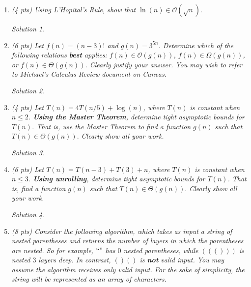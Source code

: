 \documentclass[12pt]{article}
\theoremstyle{remark}
\newtheorem*{solution}{Solution}
\newcommand{\makenonemptybox}[2]{%
\item[]
\fbox{%
\parbox[c][#1][t]{\dimexpr\linewidth-2\fboxsep-2\fboxrule}{
  \hrule width \hsize height 0pt
  #2
 }%
}%
\par\vspace{\ht\strutbox}
}
\begin{document}
\hrulefill

\begin{enumerate}


\pagebreak
\item {\itshape (4 pts) Using L'Hopital's Rule, show that $\ln(n) \in \mathcal{O}(\sqrt{n}).$}
\begin{solution}
\end{solution}

\pagebreak
\item {\itshape (6 pts) Let $f(n) = (n-3)!$ and $g(n) = 3^{5n}$. Determine which of the following relations \textbf{best} applies: $f(n) \in \mathcal{O}(g(n))$, $f(n) \in \Omega(g(n))$, or $f(n) \in \Theta(g(n))$. Clearly justify your answer. You may wish to refer to Michael's Calculus Review document on Canvas.}
\begin{solution}
\end{solution}

\pagebreak
\item {\itshape (4 pts) Let $T(n) = 4T(n/5) + \log(n)$, where $T(n)$ is constant when $n \leq 2$. \textbf{Using the Master Theorem}, determine tight asymptotic bounds for $T(n)$. That is, use the Master Theorem to find a function $g(n)$ such that $T(n) \in \Theta(g(n)).$ Clearly show all your work.}
\begin{solution}
\end{solution}


\pagebreak
\item {\itshape (6 pts) Let $T(n) = T(n-3) + T(3) + n$, where $T(n)$ is constant when $n \leq 3$. \textbf{Using unrolling}, determine tight asymptotic bounds for $T(n)$. That is, find a function $g(n)$ such that $T(n) \in \Theta(g(n)).$ Clearly show all your work.}
\begin{solution}
\end{solution}

\pagebreak
\item{\itshape (8 pts) Consider the following algorithm, which takes as input a string of nested parentheses and returns the number of layers in which the parentheses are nested. So for example, $``"$ has $0$ nested parentheses, while $((()))$ is nested $3$ layers deep. In contrast, $()()$ is \textbf{not} valid input. You may assume the algorithm receives only valid input. For the sake of simplicity, the string will be represented as an array of characters. \\

}
\end{enumerate}
\end{document}
